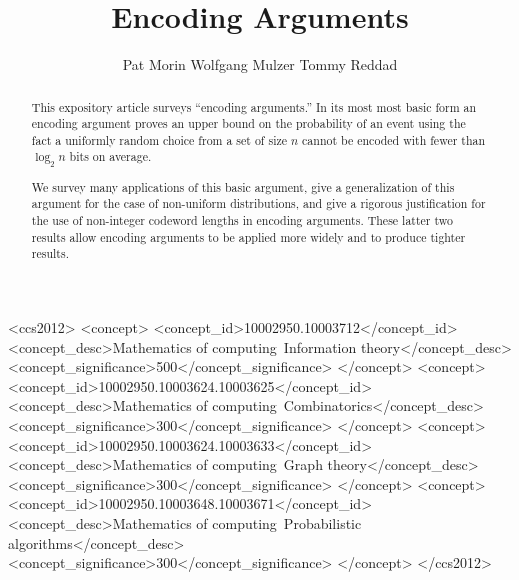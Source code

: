 \documentclass[prodmode,acmcsur]{acmsmall}
\begin{document}
\title{Encoding Arguments}

\author{
Pat Morin
Wolfgang Mulzer
Tommy Reddad
}


\begin{abstract}

  This expository article surveys ``encoding arguments.'' In its
  most most basic form an encoding argument proves an upper bound on
  the probability of an event using the fact a uniformly random choice
  from a set of size $n$ cannot be encoded with fewer than $\log_2 n$
  bits on average.

  We survey many applications of this basic argument, give a
  generalization of this argument for the case of non-uniform
  distributions, and give a rigorous justification for the use of
  non-integer codeword lengths in encoding arguments.  These latter
  two results allow encoding arguments to be applied more widely and
  to produce tighter results.
\end{abstract}

\begin{CCSXML}
<ccs2012>
<concept>
<concept_id>10002950.10003712</concept_id>
<concept_desc>Mathematics of computing~Information theory</concept_desc>
<concept_significance>500</concept_significance>
</concept>
<concept>
<concept_id>10002950.10003624.10003625</concept_id>
<concept_desc>Mathematics of computing~Combinatorics</concept_desc>
<concept_significance>300</concept_significance>
</concept>
<concept>
<concept_id>10002950.10003624.10003633</concept_id>
<concept_desc>Mathematics of computing~Graph theory</concept_desc>
<concept_significance>300</concept_significance>
</concept>
<concept>
<concept_id>10002950.10003648.10003671</concept_id>
<concept_desc>Mathematics of computing~Probabilistic algorithms</concept_desc>
<concept_significance>300</concept_significance>
</concept>
</ccs2012>
\end{CCSXML}


\end{document}
